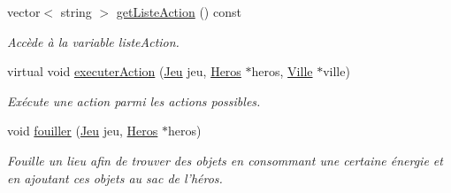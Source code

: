 \begin{DoxyCompactItemize}
vector$<$ string $>$ \hyperlink{class_lieu_a3200d6c77c575e83a3e1ccb524424e32}{get\-Liste\-Action} () const 
\begin{DoxyCompactList}\small\item\em Accède à la variable liste\-Action. \end{DoxyCompactList}\item 
virtual void \hyperlink{class_lieu_ad5d4e14283df04f0174f090f1614225c}{executer\-Action} (\hyperlink{class_jeu}{Jeu} jeu, \hyperlink{class_heros}{Heros} $\ast$heros, \hyperlink{class_ville}{Ville} $\ast$ville)
\begin{DoxyCompactList}\small\item\em Exécute une action parmi les actions possibles. \end{DoxyCompactList}\item 
void \hyperlink{class_lieu_a90d7fd86c93e59830e20156ddb7aeb50}{fouiller} (\hyperlink{class_jeu}{Jeu} jeu, \hyperlink{class_heros}{Heros} $\ast$heros)
\begin{DoxyCompactList}\small\item\em Fouille un lieu afin de trouver des objets en consommant une certaine énergie et en ajoutant ces objets au sac de l'héros. \end{DoxyCompactList}\end{DoxyCompactItemize}

